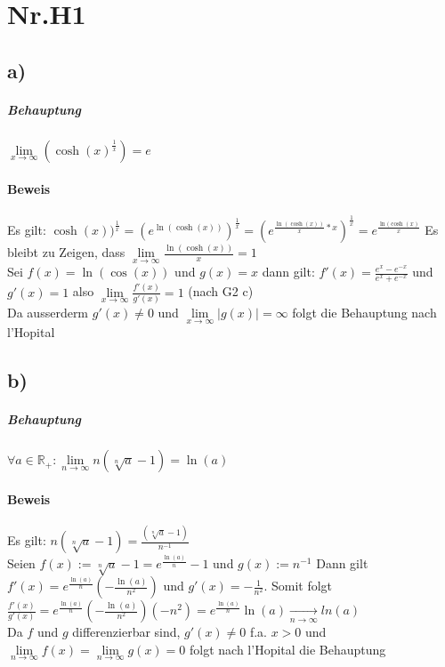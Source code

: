 \section*{Nr.H1}
\subsection*{a)}



\subparagraph*{Behauptung}

$\lim\limits_{x \to \infty}(\cosh(x)^{\frac{1}{x}}) = e$

\paragraph*{Beweis}

Es gilt: $\cosh(x))^{\frac{1}{x}} = (e^{\ln(\cosh(x))})^{\frac{1}{x}}
= (e^{\frac {\ln(\cosh(x))}{x}*x})^{\frac{1}{x}} = e^{\frac{\ln(\cosh(x)}{x}}$
Es bleibt zu Zeigen, dass $\lim\limits_{x \to \infty}\frac{\ln(\cosh(x))}{x} = 1 $\\ 
Sei $f(x) = \ln(\cos(x))$ und $g(x)=x$ dann gilt: $f'(x) = \frac{e^{x}-e^{-x}}{e^{x}+e^{-x}} $ und $g'(x) = 1$ also  $\lim\limits_{   x \to \infty} \frac{f'(x)}{g'(x)} = 1 $ (nach G2 c) \\
Da ausserderm $g'(x)\neq 0$ und $ \lim\limits_{x\to\infty} |g(x)| = \infty $ folgt die Behauptung nach l'Hopital

\subsection*{b)}

\subparagraph*{Behauptung}

$\forall a\in \mathbb{R}_{+}:\lim\limits_{n \to \infty} n(\sqrt[n]{a}-1) = \ln(a)$

\paragraph*{Beweis}
Es gilt: $n(\sqrt[n]{a}-1) = \frac{(\sqrt[n]{a}-1)}{n^{-1}}$\\
Seien $f(x):= \sqrt[n]{a}-1 = e^{\frac{\ln(a)}{n}}-1$ und $g(x):=n^{-1}$ Dann gilt \\
$f'(x) = e^{\frac{\ln(a)}{n}}(-\frac{\ln(a)}{n^2})$ und $g'(x) = -\frac{1}{n^2}$. Somit folgt \\
$\frac{f'(x)}{g'(x)} = e^{\frac{\ln(a)}{n}}(-\frac{\ln(a)}{n^{2}})(-n^{2}) = e^{\frac{\ln(a)}{n}}\ln(a) \xrightarrow[n \to \infty]{} ln(a)$ \\ Da $f$ und $g$ differenzierbar sind, $g'(x)\neq0 $ f.a. $ x>0$ und $\lim\limits_{n \to \infty} f(x) = \lim\limits_{n \to \infty} g(x) = 0$ folgt nach l'Hopital die Behauptung




